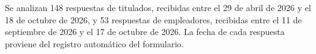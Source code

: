 Se analizan 148 respuestas de titulados, recibidas entre el 29 de abril de 2026 y el 18 de octubre de 2026, y 53 respuestas de empleadores, recibidas entre el 11 de septiembre de 2026 y el 17 de octubre de 2026. La fecha de cada respuesta proviene del registro automático del formulario.

